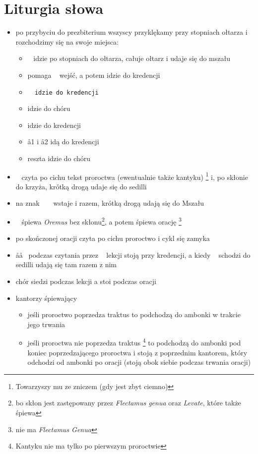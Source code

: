 \section{Liturgia słowa}

\begin{itemize}
	\item po przybyciu do prezbiterium wszyscy przyklękamy przy stopniach
	      ołtarza i rozchodzimy się na swoje miejsca:
	      \begin{itemize}
		      \item \ii~ idzie po stopniach do ołtarza, całuje ołtarz i udaje
		            się do mszału
		      \item {} pomaga \ii~ wejść, a potem idzie do kredencji
		      \item \tt~ idzie do kredencji
		      \item {} idzie do chóru
		      \item {} idzie do kredencji
		      \item \aa1 i \aa2 idą do kredencji
		      \item reszta idzie do chóru
	      \end{itemize}
	\item \ii~ czyta po cichu tekst proroctwa (ewentualnie także kantyku)
	      \footnote{Towarzyszy mu  ze zniczem (gdy jest zbyt ciemno)} i, po
	      skłonie do krzyża, krótką drogą udaje się do sedilli
	      
	\item na znak ~ \ii~ wstaje i razem, krótką drogą udają się do Mszału
	\item \ii~ śpiewa \textit{Oremus} bez skłonu\footnote{bo skłon jest
		      zastępowany przez \textit{Flectamus genua} oraz \textit{Levate},
		      które także śpiewa \ii}, a potem śpiewa orację
	      \footnote{nie ma \textit{Flectamus Genua}}
	\item po skończonej oracji czyta po cichu proroctwo i cykl się zamyka
	\item \aa\aa~ podczas czytania przez \ii~ lekcji stoją przy kredencji, a
	      kiedy \ii~ schodzi do sedilli udają się tam razem z nim
	\item chór siedzi podczas lekcji a stoi podczas oracji
	\item kantorzy śpiewający
	      \begin{itemize}
		      \item jeśli proroctwo poprzedza traktus to podchodzą do ambonki w
		            trakcie jego trwania
		      \item jeśli proroctwa nie poprzedza traktus \footnote{Kantyku nie
			            ma tylko po pierwszym proroctwie} to podchodzą do
			            ambonki pod koniec poprzedzającego proroctwa i stoją z
			            poprzednim kantorem, który odchodzi od ambonki po oracji
			            (stoją obok siebie podczas trwania oracji)
	      \end{itemize}
\end{itemize}